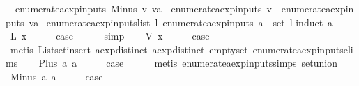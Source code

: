 \begin{isabellebody}
\ \ {\isachardoublequoteopen}enumerate{\isacharunderscore}aexp{\isacharunderscore}inputs\ {\isacharparenleft}Minus\ v\ va{\isacharparenright}\ {\isacharequal}\ enumerate{\isacharunderscore}aexp{\isacharunderscore}inputs\ v\ {\isasymunion}\ enumerate{\isacharunderscore}aexp{\isacharunderscore}inputs\ va{\isachardoublequoteclose}\isanewline
\isanewline
{}\isamarkupfalse%
\ enumerate{\isacharunderscore}aexp{\isacharunderscore}inputs{\isacharunderscore}list{\isacharcolon}\ {\isachardoublequoteopen}{\isasymexists}l{\isachardot}\ enumerate{\isacharunderscore}aexp{\isacharunderscore}inputs\ a\ {\isacharequal}\ set\ l{\isachardoublequoteclose}\isanewline
%
\isadelimproof
%
\endisadelimproof
%
\isatagproof
{}\isamarkupfalse%
{\isacharparenleft}induct\ a{\isacharparenright}\isanewline
\ \ \isamarkupfalse%
\ {\isacharparenleft}L\ x{\isacharparenright}\isanewline
\ \ \isamarkupfalse%
\ \isamarkupfalse%
\ {\isacharquery}case\isanewline
\ \ \ \ \isamarkupfalse%
\ simp\isanewline
{}\isamarkupfalse%
\isanewline
\ \ \isamarkupfalse%
\ {\isacharparenleft}V\ x{\isacharparenright}\isanewline
\ \ \isamarkupfalse%
\ \isamarkupfalse%
\ {\isacharquery}case\isanewline
\ \ \ \ \isamarkupfalse%
\ {\isacharparenleft}metis\ List{\isachardot}set{\isacharunderscore}insert\ aexp{\isachardot}distinct{\isacharparenleft}{}{\isacharparenright}\ aexp{\isachardot}distinct{\isacharparenleft}{}{\isacharparenright}\ empty{\isacharunderscore}set\ enumerate{\isacharunderscore}aexp{\isacharunderscore}inputs{\isachardot}elims{\isacharparenright}\isanewline
{}\isamarkupfalse%
\isanewline
\ \ \isamarkupfalse%
\ {\isacharparenleft}Plus\ a{}\ a{}{\isacharparenright}\isanewline
\ \ \isamarkupfalse%
\ \isamarkupfalse%
\ {\isacharquery}case\isanewline
\ \ \ \ \isamarkupfalse%
\ {\isacharparenleft}metis\ enumerate{\isacharunderscore}aexp{\isacharunderscore}inputs{\isachardot}simps{\isacharparenleft}{}{\isacharparenright}\ set{\isacharunderscore}union{\isacharparenright}\isanewline
{}\isamarkupfalse%
\isanewline
\ \ \isamarkupfalse%
\ {\isacharparenleft}Minus\ a{}\ a{}{\isacharparenright}\isanewline
\ \ \isamarkupfalse%
\ \isamarkupfalse%
\ {\isacharquery}case\isanewline
\ \ \ \ \isamarkupfalse%

\end{isabellebody}

